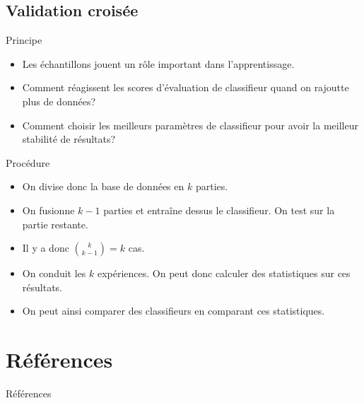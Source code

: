 \documentclass[8pt]{beamer}
\begin{document}
		\subsection{Validation croisée}
			\begin{frame}{Principe}
				\begin{itemize}
					\item<1-> Les échantillons jouent un rôle important dans l'apprentissage.
					\item<2-> Comment réagissent les scores d'évaluation de classifieur quand on rajoutte plus de données?
					\item<3-> Comment choisir les meilleurs paramètres de classifieur pour avoir la meilleur stabilité de résultats?
				\end{itemize}
			\end{frame}
			\begin{frame}{Procédure}
				\begin{itemize}
					\item<1-> On divise donc la base de données en \(k\) parties.
					\item<2-> On fusionne \(k-1\) parties et entraîne dessus le classifieur. On test sur la partie restante.
					\item<3-> Il y a donc \(\binom{k}{k-1} = k\) cas.
					\item<4-> On conduit les \(k\) expériences. On peut donc calculer des statistiques sur ces résultats.
					\item<5-> On peut ainsi comparer des classifieurs en comparant ces statistiques.
				\end{itemize}
			\end{frame}
	\section{Références}
	\begin{frame}[allowframebreaks]{Références}
		
		
	\end{frame}
\end{document}
